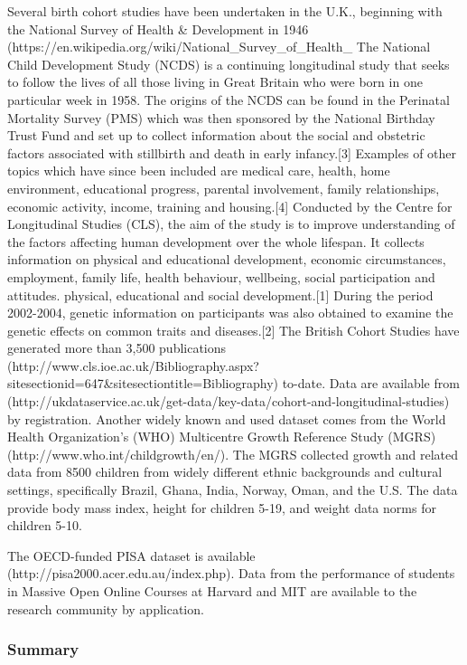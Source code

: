 \documentclass[letterpaper,man,apacite]{apa6}
\begin{document}
Several birth cohort studies have been undertaken in the U.K., beginning with the National Survey of Health & Development in 1946 (https://en.wikipedia.org/wiki/National_Survey_of_Health_%
The National Child Development Study (NCDS) is a continuing longitudinal study that seeks to follow the lives of all those living in Great Britain who were born in one particular week in 1958. 
The origins of the NCDS can be found in the Perinatal Mortality Survey (PMS) which was then sponsored by the National Birthday Trust Fund and set up to collect information about the social and obstetric factors associated with stillbirth and death in early infancy.[3] Examples of other topics which have since been included are medical care, health, home environment, educational progress, parental involvement, family relationships, economic activity, income, training and housing.[4]
Conducted by the Centre for Longitudinal Studies (CLS), the aim of the study is to improve understanding of the factors affecting human development over the whole lifespan. 
It collects information on physical and educational development, economic circumstances, employment, family life, health behaviour, wellbeing, social participation and attitudes.
physical, educational and social development.[1] During the period 2002-2004, genetic information on participants was also obtained to examine the genetic effects on common traits and diseases.[2]
The British Cohort Studies have generated more than 3,500 publications (http://www.cls.ioe.ac.uk/Bibliography.aspx?sitesectionid=647&sitesectiontitle=Bibliography) to-date.
Data are available from (http://ukdataservice.ac.uk/get-data/key-data/cohort-and-longitudinal-studies) by registration.
Another widely known and used dataset comes from the World Health Organization's (WHO) Multicentre Growth Reference Study (MGRS) (http://www.who.int/childgrowth/en/).
The MGRS collected growth and related data from 8500 children from widely different ethnic backgrounds and cultural settings, specifically Brazil, Ghana, India, Norway, Oman, and the U.S.
The data provide body mass index, height for children 5-19, and weight data norms for children 5-10.

The OECD-funded PISA dataset is available (http://pisa2000.acer.edu.au/index.php).
Data from the performance of students in Massive Open Online Courses at Harvard and MIT are available to the research community by application.  

\subsubsection{Summary}
\end{document}
